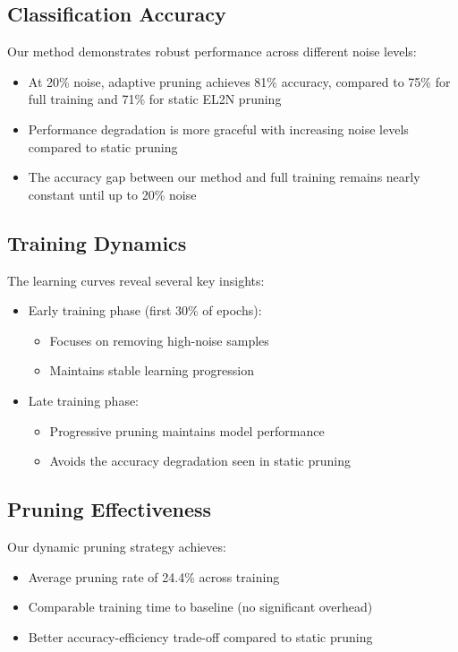 \documentclass{article}
\begin{document}
\subsection{Classification Accuracy}

Our method demonstrates robust performance across different noise levels:

\begin{itemize}
    \item At 20\% noise, adaptive pruning achieves 81\% accuracy, compared to 75\% for full training and 71\% for static EL2N pruning
    \item Performance degradation is more graceful with increasing noise levels compared to static pruning
    \item The accuracy gap between our method and full training remains nearly constant until up to 20\% noise
\end{itemize}

\subsection{Training Dynamics}

The learning curves reveal several key insights:

\begin{itemize}
    \item Early training phase (first 30\% of epochs): 
        \begin{itemize}
            \item Focuses on removing high-noise samples
            \item Maintains stable learning progression
        \end{itemize}
    \item Late training phase:
        \begin{itemize}
            \item Progressive pruning maintains model performance
            \item Avoids the accuracy degradation seen in static pruning
        \end{itemize}
\end{itemize}

\subsection{Pruning Effectiveness}

Our dynamic pruning strategy achieves:

\begin{itemize}
    \item Average pruning rate of 24.4\% across training
    \item Comparable training time to baseline (no significant overhead)
    \item Better accuracy-efficiency trade-off compared to static pruning
\end{itemize}
\end{document}
